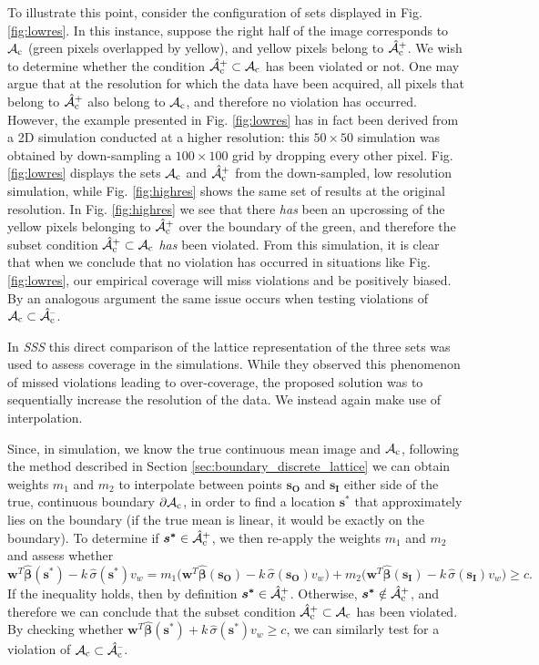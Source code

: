 To illustrate this point, consider the configuration of sets displayed in Fig. \ref{fig:lowres}. In this instance, suppose the right half of the image corresponds to $\operatorname{\mathcal{A}_{c}}$ (green pixels overlapped by yellow), and yellow pixels belong to $\operatorname{\hat{\mathcal{A}}_{c}^+}$. We wish to determine whether the condition $\operatorname{\hat{\mathcal{A}}_{c}^+} \subset \operatorname{\mathcal{A}_{c}}$ has been violated or not. One may argue that at the resolution for which the data have been acquired, all pixels that belong to $\operatorname{\hat{\mathcal{A}}_{c}^+}$ also belong to $\operatorname{\mathcal{A}_{c}}$, and therefore no violation has  occurred. However, the example presented in Fig. \ref{fig:lowres} has in fact been derived from a 2D simulation conducted at a higher resolution: this $50 \times 50$ simulation was obtained by down-sampling a $100 \times 100$ grid by dropping every other pixel. 
Fig. \ref{fig:lowres} displays the sets $\operatorname{\mathcal{A}_{c}}$ and $\operatorname{\hat{\mathcal{A}}_{c}^+}$ from the down-sampled, low resolution simulation, while Fig. \ref{fig:highres} shows the same set of results at the original resolution. In Fig. \ref{fig:highres} we see that there \textit{has} been an upcrossing of the yellow pixels belonging to $\operatorname{\hat{\mathcal{A}}_{c}^+}$ over the boundary of the green, and therefore the subset condition $\operatorname{\hat{\mathcal{A}}_{c}^+} \subset \operatorname{\mathcal{A}_{c}}$ \textit{has} been violated. From this simulation, it is clear that when we conclude that no violation has occurred in situations like Fig. \ref{fig:lowres}, our empirical coverage will miss violations and be positively biased. By an analogous argument the same issue occurs when testing violations of $\operatorname{\mathcal{A}_{c}} \subset \operatorname{\hat{\mathcal{A}}_{c}^{\textrm{--}}}$.

In \textit{SSS} this direct comparison of the lattice representation of the three sets was used to assess coverage in the simulations. While  they observed this phenomenon of missed violations leading to over-coverage, the proposed solution was to sequentially increase the resolution of the data. We instead again make use of interpolation.

Since, in simulation, we know the true continuous mean image and $\operatorname{\mathcal{A}_{c}}$, following the method described in Section \ref{sec:boundary_discrete_lattice} we can obtain weights $m_1$ and $m_2$ to interpolate between points $\bm{s_O}$ and $\bm{s_I}$ either side of the true, continuous boundary $\operatorname{\partial\mathcal{A}_{c}}$, in order to find a location $\bm{s^*}$ that approximately lies on the boundary (if the true mean is linear, it would be exactly on the boundary). To determine if $\bm{s^*} \in \operatorname{\hat{\mathcal{A}}_{c}^+}$, we then re-apply the weights $m_1$ and $m_2$ and assess whether
\begin{equation}
\label{eq:interpolation_in_action}
\bm{w}^{T}\bm{\hat{\beta}}(\bm{s^{*}}) - k\, \hat{\sigma}(\bm{s^{*}}) v_{w} = m_1 \Bigg( \bm{w}^{T}\bm{\hat{\beta}}(\bm{s_O}) - k\, \hat{\sigma}(\bm{s_O}) v_{w} \Bigg) + m_2 \Bigg( \bm{w}^{T}\bm{\hat{\beta}}(\bm{s_I}) - k\, \hat{\sigma}(\bm{s_I}) v_{w} \Bigg) \geq c.
\end{equation}
 If the inequality holds, then by definition $\bm{s^{*}} \in \operatorname{\hat{\mathcal{A}}_{c}^+}$. Otherwise, $\bm{s^{*}} \notin \operatorname{\hat{\mathcal{A}}_{c}^+}$, and therefore we can conclude that the subset condition $\operatorname{\hat{\mathcal{A}}_{c}^+} \subset \operatorname{\mathcal{A}_{c}}$ has been violated. By checking whether $\bm{w}^{T}\bm{\hat{\beta}}(\bm{s^{*}}) + k\, \hat{\sigma}(\bm{s^{*}}) v_{w} \geq c$, we can similarly test for a violation of $\operatorname{\mathcal{A}_{c}} \subset \operatorname{\hat{\mathcal{A}}_{c}^{\textrm{--}}}$.
 
